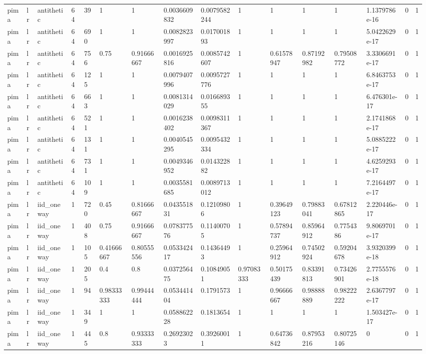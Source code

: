 \begin{tabular}{llllllllllllllll}
pima & lr & antithetic & 64 & 39 & 1 & 1 & 0.0036609832 & 0.0079582244 & 1 & 1 & 1 & 1 & 1.1379786e-16 & 0 & 1 \\
pima & lr & antithetic & 64 & 690 & 1 & 1 & 0.0082823997 & 0.017001893 & 1 & 1 & 1 & 1 & 5.0422629e-17 & 0 & 1 \\
pima & lr & antithetic & 64 & 756 & 0.75 & 0.91666667 & 0.0016925816 & 0.0085742607 & 1 & 0.61578947 & 0.87192982 & 0.79508772 & 3.3306691e-17 & 0 & 1 \\
pima & lr & antithetic & 64 & 125 & 1 & 1 & 0.0079407996 & 0.0095727776 & 1 & 1 & 1 & 1 & 6.8463753e-17 & 0 & 1 \\
pima & lr & antithetic & 64 & 663 & 1 & 1 & 0.0081314029 & 0.016689355 & 1 & 1 & 1 & 1 & 6.476301e-17 & 0 & 1 \\
pima & lr & antithetic & 64 & 521 & 1 & 1 & 0.0016238402 & 0.0098311367 & 1 & 1 & 1 & 1 & 2.1741868e-17 & 0 & 1 \\
pima & lr & antithetic & 64 & 131 & 1 & 1 & 0.0040545295 & 0.0095432334 & 1 & 1 & 1 & 1 & 5.0885222e-17 & 0 & 1 \\
pima & lr & antithetic & 64 & 731 & 1 & 1 & 0.0049346952 & 0.014322882 & 1 & 1 & 1 & 1 & 4.6259293e-17 & 0 & 1 \\
pima & lr & antithetic & 64 & 109 & 1 & 1 & 0.0035581685 & 0.0089713012 & 1 & 1 & 1 & 1 & 7.2164497e-17 & 0 & 1 \\
pima & lr & iid\_oneway & 1 & 720 & 0.45 & 0.81666667 & 0.043551831 & 0.12109806 & 1 & 0.39649123 & 0.79883041 & 0.67812865 & 2.220446e-17 & 0 & 1 \\
pima & lr & iid\_oneway & 1 & 408 & 0.75 & 0.91666667 & 0.078377576 & 0.11400705 & 1 & 0.57894737 & 0.85964912 & 0.7754386 & 9.8069701e-17 & 0 & 1 \\
pima & lr & iid\_oneway & 1 & 105 & 0.41666667 & 0.80555556 & 0.053342417 & 0.14364493 & 1 & 0.25964912 & 0.74502924 & 0.59204678 & 3.9320399e-18 & 0 & 1 \\
pima & lr & iid\_oneway & 1 & 205 & 0.4 & 0.8 & 0.037256475 & 0.10849051 & 0.97083333 & 0.50175439 & 0.83391813 & 0.73426901 & 2.7755576e-18 & 0 & 1 \\
pima & lr & iid\_oneway & 1 & 94 & 0.98333333 & 0.99444444 & 0.053441404 & 0.1791573 & 1 & 0.96666667 & 0.98888889 & 0.98222222 & 2.6367797e-17 & 0 & 1 \\
pima & lr & iid\_oneway & 1 & 349 & 1 & 1 & 0.058862228 & 0.1813654 & 1 & 1 & 1 & 1 & 1.503427e-17 & 0 & 1 \\
pima & lr & iid\_oneway & 1 & 445 & 0.8 & 0.93333333 & 0.26923023 & 0.39260011 & 1 & 0.64736842 & 0.87953216 & 0.80725146 & 0 & 0 & 1 \\

\end{tabular}

